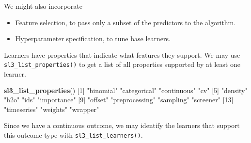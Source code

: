 \documentclass[12pt, krantz2,]{krantz}
\newenvironment{Shaded}{\begin{snugshade}}{\end{snugshade}}
\newcommand{\DecValTok}[1]{\textcolor[rgb]{0.06,0.06,0.06}{#1}}
\newcommand{\KeywordTok}[1]{\textcolor[rgb]{0.27,0.27,0.27}{\textbf{#1}}}
\newcommand{\NormalTok}[1]{#1}
\newcommand{\StringTok}[1]{\textcolor[rgb]{0.5,0.5,0.5}{#1}}
\providecommand{\tightlist}{%
  \setlength{\itemsep}{0pt}\setlength{\parskip}{0pt}}
\theoremstyle{definition}
\theoremstyle{definition}
\theoremstyle{definition}
\newcommand{\1}{\mathbbm{1}}
\begin{document}
We might also incorporate

\begin{itemize}
\tightlist
\item
  Feature selection, to pass only a subset of the predictors to the algorithm.
\item
  Hyperparameter specification, to tune base learners.
\end{itemize}

Learners have properties that indicate what features they support. We may use
\texttt{sl3\_list\_properties()} to get a list of all properties supported by at least
one learner.

\begin{Shaded}
\begin{Highlighting}[]
\KeywordTok{sl3_list_properties}\NormalTok{()}
\NormalTok{ [}\DecValTok{1}\NormalTok{] }\StringTok{"binomial"}      \StringTok{"categorical"}   \StringTok{"continuous"}    \StringTok{"cv"}           
\NormalTok{ [}\DecValTok{5}\NormalTok{] }\StringTok{"density"}       \StringTok{"h2o"}           \StringTok{"ids"}           \StringTok{"importance"}   
\NormalTok{ [}\DecValTok{9}\NormalTok{] }\StringTok{"offset"}        \StringTok{"preprocessing"} \StringTok{"sampling"}      \StringTok{"screener"}     
\NormalTok{[}\DecValTok{13}\NormalTok{] }\StringTok{"timeseries"}    \StringTok{"weights"}       \StringTok{"wrapper"}      
\end{Highlighting}
\end{Shaded}

Since we have a continuous outcome, we may identify the learners that support
this outcome type with \texttt{sl3\_list\_learners()}.
\end{document}
